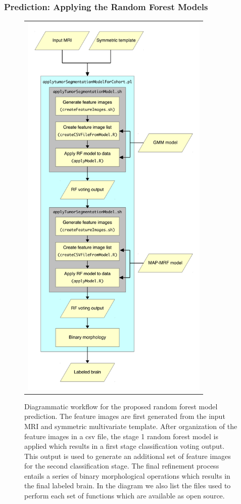 \documentclass[final,5p,times,twocolumn]{elsarticle}
\begin{document}
\subsubsection{Prediction:  Applying the Random Forest Models}

\begin{figure}
  \centering
  \begin{tabular}{c}
    \includegraphics[width=90mm]{Figures/pipeline.pdf}
  \end{tabular}
  \caption{Diagrammatic workflow for the proposed random forest model prediction.  The feature
  images are first generated from the input MRI and symmetric multivariate template. 
  After organization of the feature images in a csv file, the stage 1 random forest model is 
  applied which results in a first stage classification voting output.  This output
  is used to generate an additional set of feature images for the second classification
  stage.  The final refinement process entails a series of binary morphological 
  operations which results in the final labeled brain.  In the diagram we also list
  the files used to perform each set of functions which are available as open source.
  }
  \label{fig:pipeline}
\end{figure}
\end{document}
